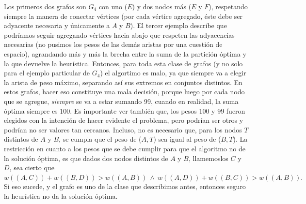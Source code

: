 \documentclass[a4paper]{article}
\begin{document}
Los primeros dos grafos son $G_4$ con uno ($E$) y dos nodos más ($E$ y $F$), respetando siempre la manera de conectar vértices (por cada vértice agregado, éste debe ser adyacente necesaria y únicamente a $A$ y $B$). El tercer ejemplo describe que podríamos seguir agregando vértices hacia abajo que respeten las adyacencias necesarias (no pusimos los pesos de las demás aristas por una cuestión de espacio), agrandando más y más la brecha entre la suma de la partición óptima y la que devuelve la heurística. Entonces, para toda esta clase de grafos (y no solo para el ejemplo particular de $G_4$) el algortimo es malo, ya que siempre va a elegir la arista de peso máximo, separando así sus extremos en conjuntos distintos. En estos grafos, hacer eso constituye una mala decisión, porque luego por cada nodo que se agregue, \textit{siempre} se va a estar sumando 99, cuando en realidad, la suma óptima siempre es 100.
\newline Es importante ver también que, los pesos 100 y 99 fueron elegidos con la intención de hacer evidente el problema, pero podrían ser otros y podrían no ser valores tan cercanos. Incluso, no es necesario que, para los nodos $T$ distintos de $A$ y $B$, se cumpla que el peso de ($A, T$) sea igual al peso de ($B, T$). La restricción en cuanto a los pesos que se debe cumplir para que el algoritmo no de la solución óptima, es que dados dos nodos distintos de $A$ y $B$, llamemoslos $C$ y $D$, sea cierto que $w((A, C)) + w((B, D)) > w((A, B)) \ \wedge \ w((A, D)) + w((B, C)) > w((A, B)).$ Si eso sucede, y el grafo es uno de la clase que describimos antes, entonces seguro la heurística no da la solución óptima.
\end{document}
